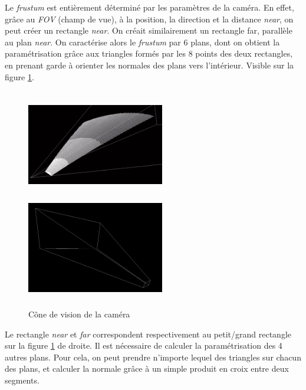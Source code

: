   Le \emph{frustum} est entièrement déterminé par les paramètres de la caméra.  
  En effet, grâce au \textit{FOV} (champ de vue), à la position, la direction et la distance \emph{near}, on peut créer un rectangle \emph{near}. On créait similairement un rectangle far, parallèle au plan \emph{near}. On caractérise alors le \emph{frustum} par 6 plans, dont on obtient la paramétrisation grâce aux triangles formés par les 8 points des deux rectangles, en prenant garde à orienter les normales des plans vers l'intérieur. Visible sur la figure \ref{fig:culling}.\\
  \paragraph{}
  \begin{figure}[H]
  \centerline{
  \includegraphics[width=6cm,height=4.5cm]{img/culling.png}
  \includegraphics[width=6cm,height=4.5cm]{img/frustumbox.png}}
  \caption{Cône de vision de la caméra \protect\footnotemark}
  \label{fig:culling}
  \end{figure}
  Le rectangle \textit{near} et \textit{far} correspondent respectivement au petit/grand rectangle sur la figure \ref{fig:culling} de droite. 
  Il est nécessaire de calculer la paramétrisation des 4 autres plans. Pour cela, on peut prendre n'importe lequel des triangles sur chacun des plans, et calculer la normale grâce à un simple produit en croix entre deux segments.
  
  \paragraph{}
 
